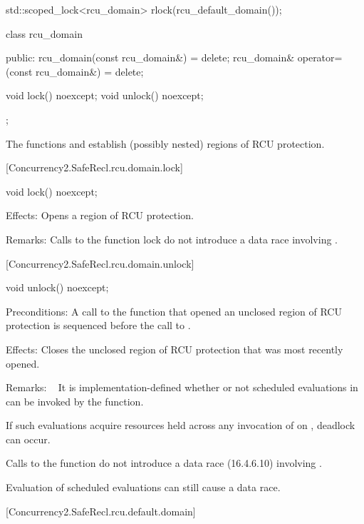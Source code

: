 \begin{codeblock}
std::scoped_lock<rcu_domain> rlock(rcu_default_domain());
\end{codeblock}

\begin{codeblock}
class rcu_domain {
public:
  rcu_domain(const rcu_domain&) = delete;
  rcu_domain& operator=(const rcu_domain&) = delete;

  void lock() noexcept;
  void unlock() noexcept;
};
\end{codeblock}

The functions  and  establish (possibly nested)
regions of RCU protection.

[Concurrency2.SafeRecl.rcu.domain.lock]{}

\begin{codeblock}
void lock() noexcept;
\end{codeblock}

\pnum
Effects: Opens a region of RCU protection.

\pnum
Remarks: Calls to the function lock do not introduce a data race
 involving .

[Concurrency2.SafeRecl.rcu.domain.unlock]{}

\begin{codeblock}
void unlock() noexcept;
\end{codeblock}

\pnum
Preconditions: A call to the function  that opened
an unclosed region of RCU protection is sequenced before the
call to .

\pnum
Effects: Closes the unclosed region of RCU protection that was
most recently opened.

\pnum
Remarks:   It is implementation-defined whether or not scheduled
evaluations in  can be invoked by the 
function.
\begin{note}
If such evaluations acquire resources held across any invocation
of  on , deadlock can occur.
\end{note}
Calls to the function  do not introduce a data race
(16.4.6.10) involving .
\begin{note}
Evaluation of scheduled evaluations can still cause a data race.
\end{note}

[Concurrency2.SafeRecl.rcu.default.domain]{}

